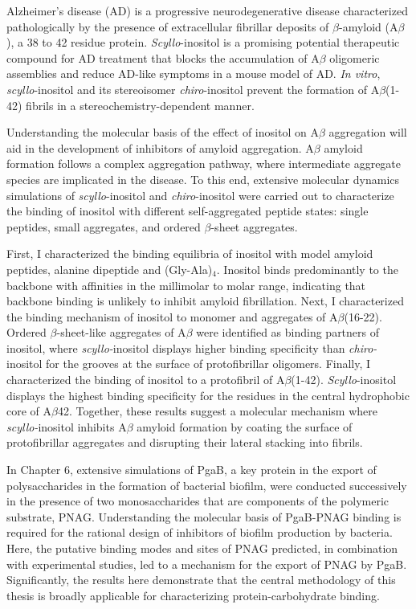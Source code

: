Alzheimer's disease (AD) is a progressive neurodegenerative disease characterized pathologically by the presence of extracellular fibrillar deposits of $\beta$-amyloid (A$\beta$), a 38 to 42 residue protein. \emph{Scyllo}-inositol is a promising potential therapeutic compound for AD treatment that blocks the accumulation of A$\beta$ oligomeric assemblies and reduce AD-like symptoms in a mouse model of AD. \emph{In vitro}, \emph{scyllo}-inositol and its stereoisomer \emph{chiro}-inositol prevent the formation of A$\beta$(1-42) fibrils in a stereochemistry-dependent manner. 

Understanding the molecular basis of the effect of inositol on A$\beta$ aggregation will aid in the development of inhibitors of amyloid aggregation. A$\beta$ amyloid formation follows a complex aggregation pathway, where intermediate aggregate species are implicated in the disease.  To this end, extensive molecular dynamics simulations of \emph{scyllo}-inositol and \emph{chiro}-inositol were carried out to characterize the binding of inositol with different self-aggregated peptide states: single peptides, small aggregates, and ordered $\beta$-sheet aggregates. 

First, I characterized the binding equilibria of inositol with model amyloid peptides, alanine dipeptide and (Gly-Ala)$_4$.  Inositol binds predominantly to the backbone with affinities in the millimolar to molar range, indicating that backbone binding is unlikely to inhibit amyloid fibrillation. Next, I characterized the binding mechanism of inositol to monomer and aggregates of A$\beta$(16-22). Ordered $\beta$-sheet-like aggregates of A$\beta$ were identified as binding partners of inositol, where \textit{scyllo-}inositol displays higher binding specificity than \textit{chiro-}inositol for the grooves at the surface of protofibrillar oligomers. Finally, I characterized the binding of inositol to a protofibril of A$\beta$(1-42).  \textit{Scyllo}-inositol displays the highest binding specificity for the residues in the central hydrophobic core of A$\beta$42.  Together, these results suggest a molecular mechanism where \textit{scyllo-}inositol inhibits A$\beta$ amyloid formation by coating the surface of protofibrillar aggregates and disrupting their lateral stacking into fibrils.

In Chapter 6, extensive simulations of PgaB, a key protein in the export of polysaccharides in the formation of bacterial biofilm, were conducted successively in the presence of two monosaccharides that are components of the polymeric substrate, PNAG. Understanding the molecular basis of PgaB-PNAG binding is required for the rational design of inhibitors of biofilm production by bacteria. Here, the putative binding modes and sites of PNAG predicted, in combination with experimental studies, led to a mechanism for the export of PNAG by PgaB. Significantly, the results here demonstrate that the central methodology of this thesis is broadly applicable for characterizing protein-carbohydrate binding.